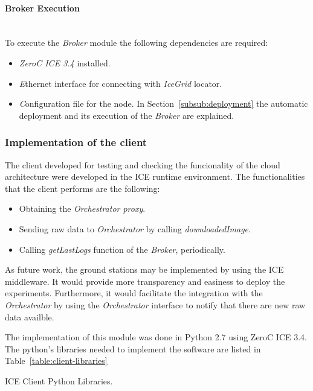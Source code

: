 \paragraph{Broker Execution}~\\

To execute the \emph{Broker} module the following dependencies
are required:
\begin{itemize}
\item \emph{ZeroC ICE 3.4} installed.
\item \emph Ethernet interface for connecting with \emph{IceGrid} locator.
\item \emph Configuration file for the node. In Section~\ref{subsub:deployment} the
  automatic deployment and its execution of the \emph{Broker} are explained. 
\end{itemize}


\subsubsection{Implementation of the client}

The client developed for testing and checking the funcionality of the cloud
architecture were developed in the ICE runtime environment. The functionalities
that the client performs are the following:
\begin{itemize}
\item Obtaining the \emph{Orchestrator proxy}.
\item Sending raw data to  \emph{Orchestrator} by calling \emph{downloadedImage}.
\item Calling \emph{getLastLogs} function of the \emph{Broker}, periodically.
\end{itemize}

As future work, the ground stations may be implemented by using the ICE
middleware. It would provide more transparency and easiness to deploy the
experiments. Furthermore, it would facilitate the integration with the
\emph{Orchestrator} by using the \emph{Orchestrator} interface to notify that
there are new raw data availble.

The implementation of this module was done in Python 2.7 using ZeroC ICE 3.4. The
python's libraries needed to implement the software are listed in
Table~\ref{table:client-libraries}

\begin{table}[hp]
  \centering
  {\small
  
  }
  \caption{ICE Client Python Libraries.}
  \label{table:client-libraries}
\end{table}

